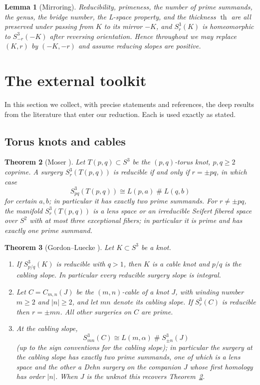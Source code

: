 \documentclass[11pt]{amsart}
\newtheorem{theorem}{Theorem}[section]
\newtheorem{lemma}[theorem]{Lemma}
\theoremstyle{definition}
\theoremstyle{remark}
\numberwithin{equation}{section}
\begin{document}
\begin{lemma}[Mirroring]\label{lem:mirror}
Reducibility, primeness, the number of prime summands, the genus, the
bridge number, the L-space property, and the thickness
$\operatorname{th}$ are all preserved under passing from $K$ to its
mirror $-K$, and $S^{3}_{r}(K)$ is homeomorphic to $S^{3}_{-r}(-K)$
after reversing orientation. Hence throughout we may replace $(K,r)$ by
$(-K,-r)$ and assume reducing slopes are positive.
\end{lemma}

\section{The external toolkit}\label{sec:toolkit}

In this section we collect, with precise statements and references, the
deep results from the literature that enter our reduction. Each is used
exactly as stated.

\subsection{Torus knots and cables}

\begin{theorem}[Moser \cite{Moser}]\label{thm:moser}
Let $T(p,q)\subset S^{3}$ be the $(p,q)$-torus knot, $p,q\ge2$ coprime.
A surgery $S^{3}_{r}(T(p,q))$ is reducible if and only if $r=\pm pq$,
in which case
\[
S^{3}_{pq}(T(p,q))\cong L(p,a)\;\#\;L(q,b)
\]
for certain $a,b$; in particular it has exactly two prime summands.
For $r\neq\pm pq$, the manifold $S^{3}_{r}(T(p,q))$ is a lens space or an
irreducible Seifert fibered space over $S^{2}$ with at most three
exceptional fibers; in particular it is prime and has exactly one prime
summand.
\end{theorem}

\begin{theorem}[Gordon--Luecke \cite{GL1,GL2}]\label{thm:GL}
Let $K\subset S^{3}$ be a knot.
\begin{enumerate}
\item[(a)] If $S^{3}_{p/q}(K)$ is reducible with $q>1$, then $K$ is a
cable knot and $p/q$ is the cabling slope. In particular every reducible
surgery slope is integral.
\item[(b)] Let $C=C_{m,n}(J)$ be the $(m,n)$-cable of a knot $J$, with
winding number $m\ge2$ and $|n|\ge2$, and let $mn$ denote its cabling
slope. If $S^{3}_{r}(C)$ is reducible then $r=\pm mn$. All other
surgeries on $C$ are prime.
\item[(c)] At the cabling slope,
\[
S^{3}_{mn}(C)\cong L(m,\alpha)\;\#\;S^{3}_{\pm n}(J)
\]
(up to the sign conventions for the cabling slope); in particular the
surgery at the cabling slope has exactly two prime summands, one of which
is a lens space and the other a Dehn surgery on the companion $J$ whose
first homology has order $|n|$. When $J$ is the unknot this recovers
Theorem~\ref{thm:moser}.
\end{enumerate}
\end{theorem}
\end{document}
